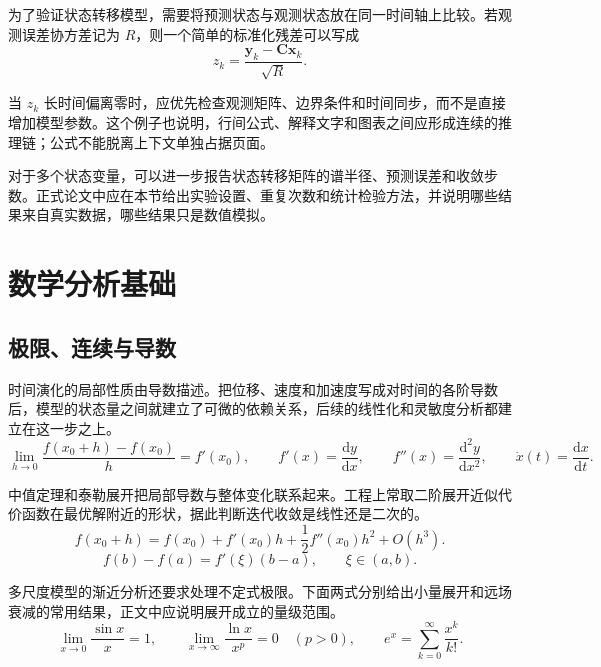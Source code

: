 为了验证状态转移模型，需要将预测状态与观测状态放在同一时间轴上比较。若观测误差协方差记为 $R$，则一个简单的标准化残差可以写成
\begin{equation}
  z_k=\frac{\bm{y}_k-\bm{C}\bm{x}_k}{\sqrt{R}}.
  \label{eq:standardized-residual}
\end{equation}

当 $z_k$ 长时间偏离零时，应优先检查观测矩阵、边界条件和时间同步，而不是直接增加模型参数。这个例子也说明，行间公式、解释文字和图表之间应形成连续的推理链；公式不能脱离上下文单独占据页面。

对于多个状态变量，可以进一步报告状态转移矩阵的谱半径、预测误差和收敛步数。正式论文中应在本节给出实验设置、重复次数和统计检验方法，并说明哪些结果来自真实数据，哪些结果只是数值模拟。

\section{数学分析基础}

\subsection{极限、连续与导数}

时间演化的局部性质由导数描述。把位移、速度和加速度写成对时间的各阶导数后，模型的状态量之间就建立了可微的依赖关系，后续的线性化和灵敏度分析都建立在这一步之上。
\begin{equation}
  \lim_{h\to0}\frac{f(x_0+h)-f(x_0)}{h}=f'(x_0),\qquad
  f'(x)=\frac{\mathrm{d}y}{\mathrm{d}x},\qquad
  f''(x)=\frac{\mathrm{d}^2y}{\mathrm{d}x^2},\qquad
  \dot{x}(t)=\frac{\mathrm{d}x}{\mathrm{d}t}.
  \label{eq:derivative}
\end{equation}

中值定理和泰勒展开把局部导数与整体变化联系起来。工程上常取二阶展开近似代价函数在最优解附近的形状，据此判断迭代收敛是线性还是二次的。
\begin{equation}
  f(x_0+h)=f(x_0)+f'(x_0)h+\frac{1}{2}f''(x_0)h^2+O(h^3).
  \label{eq:taylor}
\end{equation}
\begin{equation}
  f(b)-f(a)=f'(\xi)(b-a),\qquad \xi\in(a,b).
  \label{eq:mean-value}
\end{equation}

多尺度模型的渐近分析还要求处理不定式极限。下面两式分别给出小量展开和远场衰减的常用结果，正文中应说明展开成立的量级范围。
\begin{equation}
  \lim_{x\to0}\frac{\sin x}{x}=1,\qquad
  \lim_{x\to\infty}\frac{\ln x}{x^p}=0\quad(p>0),\qquad
  e^x=\sum_{k=0}^{\infty}\frac{x^k}{k!}.
  \label{eq:asymptotic-limits}
\end{equation}

